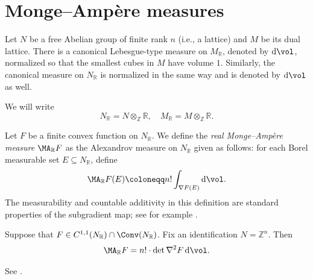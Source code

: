 \section{Monge--Amp\`ere measures}
\label{sec:convex_MA}
Let $N$ be a free Abelian group of finite rank $n$ (i.e., a lattice) and $M$ be its dual lattice. There is a canonical Lebesgue-type measure on $M_{\mathbb{R}}$, denoted by $\mathrm{d}\vol$, normalized so that the smallest cubes in $M$ have volume $1$. Similarly, the canonical measure on $N_{\mathbb{R}}$ is normalized in the same way and is denoted by $\mathrm{d}\vol$ as well.

We will write
\[
N_{\mathbb{R}}=N\otimes_{\mathbb{Z}}\mathbb{R},\quad M_{\mathbb{R}}=M\otimes_{\mathbb{Z}}\mathbb{R}.
\]

\begin{definition}\label{def:realMA}
    Let $F$ be a finite convex function on $N_{\mathbb{R}}$. We define the \emph{real Monge--Ampère measure} $\MA_{\mathbb{R}}F$ as the Alexandrov measure on $N_{\mathbb{R}}$ given as follows: for each Borel measurable set $E\subseteq N_{\mathbb{R}}$, define
    \begin{equation}\label{eq:MARFE}
        \MA_{\mathbb{R}}F(E)\coloneqq n!\int_{\nabla F(E)} \mathrm{d}\vol.
    \end{equation}
    The measurability and countable additivity in this definition are standard properties of the subgradient map; see for example \cite[Section~2.1]{Fig17}.
\end{definition}

\begin{proposition}\label{prop:smoothMAreal}
    Suppose that $F\in C^{1,1}(N_{\mathbb{R}})\cap \Conv(N_{\mathbb{R}})$. Fix an identification $N=\mathbb{Z}^n$. Then
    \[
    \MA_{\mathbb{R}}F=n!\cdot \det \nabla^2 F \,\mathrm{d}\vol.
    \]
\end{proposition}
See \cite[Example~2.2]{Fig17}.

